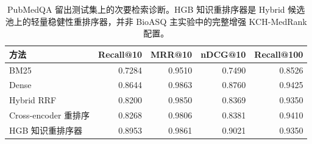 \begin{table}[t]
\centering
\small
\caption{PubMedQA 留出测试集上的次要检索诊断。HGB 知识重排序器是 Hybrid 候选池上的轻量稳健性重排序器，并非 BioASQ 主实验中的完整增强 KCH-MedRank 配置。}
\label{tab:pubmedqa-retrieval-diagnostic}
\begin{tabular}{lrrrr}
\toprule
方法 & Recall@10 & MRR@10 & nDCG@10 & Recall@100 \\
\midrule
BM25 & 0.7284 & 0.9510 & 0.7490 & 0.8526 \\
Dense & 0.8644 & 0.9863 & 0.8760 & 0.9425 \\
Hybrid RRF & 0.8200 & 0.9850 & 0.8369 & 0.9350 \\
Cross-encoder 重排序 & 0.8268 & 0.9806 & 0.8381 & 0.9410 \\
HGB 知识重排序器 & 0.8953 & 0.9861 & 0.9021 & 0.9350 \\
\bottomrule
\end{tabular}
\end{table}

